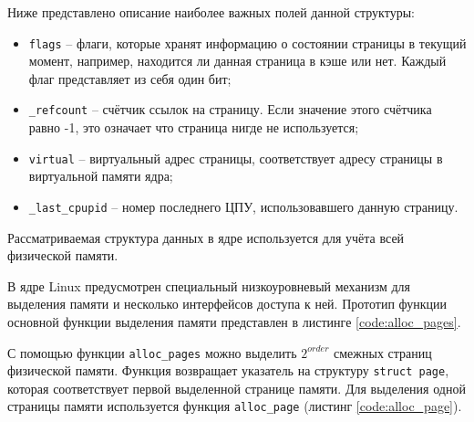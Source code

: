 
Ниже представлено описание наиболее важных полей данной структуры:

\begin{itemize}
	\item \texttt{flags} -- флаги, которые хранят информацию о состоянии страницы в текущий момент, например, находится ли данная страница в кэше или нет. Каждый флаг представляет из себя один бит;
	\item \texttt{\_refcount} -- счётчик ссылок на страницу. Если значение этого счётчика равно -1, это означает что страница нигде не используется;
	\item \texttt{virtual} -- виртуальный адрес страницы, соответствует адресу страницы в виртуальной памяти ядра;
	\item \texttt{\_last\_cpupid} -- номер последнего ЦПУ, использовавшего данную страницу.
\end{itemize}

Рассматриваемая структура данных в ядре используется для учёта всей физической памяти.

В ядре Linux предусмотрен специальный низкоуровневый механизм для выделения памяти и несколько интерфейсов доступа к ней. Прототип функции основной функции выделения памяти представлен в листинге \ref{code:alloc_pages}.


С помощью функции \texttt{alloc\_pages} можно выделить $2^{order}$ смежных страниц физической памяти. Функция возвращает указатель на структуру \texttt{struct page}, которая соответствует первой выделенной странице памяти. Для выделения одной страницы памяти используется функция \texttt{alloc\_page} (листинг \ref{code:alloc_page}).


